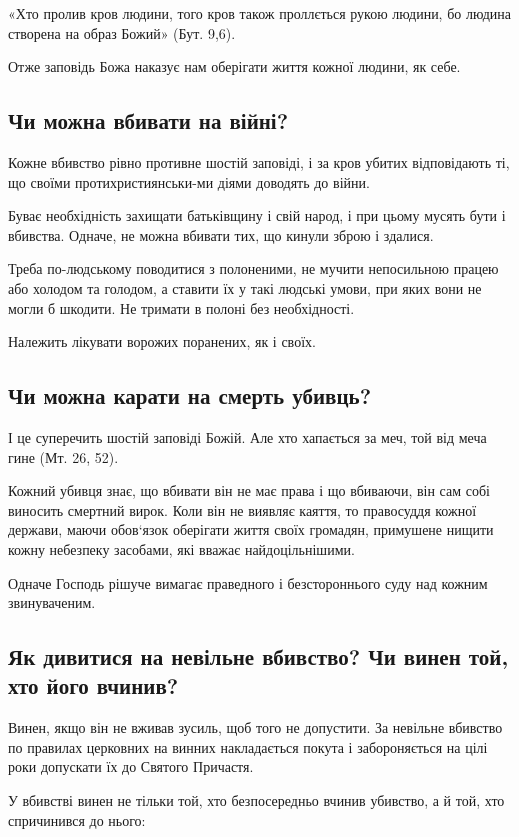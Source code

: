 \documentclass[main.tex]{subfiles}
\begin{document}
«Хто пролив кров людини, того кров також проллється рукою людини, бо людина створена на образ Божий» (Бут. 9,6).

Отже заповідь Божа наказує нам оберігати життя кожної людини, як себе.

\subsection{Чи можна вбивати на війні?}

Кожне вбивство рівно противне шостій заповіді, і за кров убитих відповідають ті, що своїми протихристиянськи-ми діями доводять до війни.

Буває необхідність захищати батьківщину і свій народ, і при цьому мусять бути і вбивства. Одначе, не можна вбивати тих, що кинули зброю і здалися.

Треба по-людському поводитися з полоненими, не мучити непосильною працею або холодом та голодом, а ставити їх у такі людські умови, при яких вони не могли б шкодити. Не тримати в полоні без необхідності.

Належить лікувати ворожих поранених, як і своїх.

\subsection{Чи можна карати на смерть убивць?}

І це суперечить шостій заповіді Божій. Але хто хапається за меч, той від меча гине (Мт. 26, 52).

Кожний убивця знає, що вбивати він не має права і що вбиваючи, він сам собі виносить смертний вирок. Коли він не виявляє каяття, то правосуддя кожної держави, маючи обов`язок оберігати життя своїх громадян, примушене нищити кожну небезпеку засобами, які вважає найдоцільнішими.

Одначе Господь рішуче вимагає праведного і безстороннього суду над кожним звинуваченим.

\subsection{Як дивитися на невільне вбивство? Чи винен той, хто його вчинив?}

Винен, якщо він не вживав зусиль, щоб того не допустити. За невільне вбивство по правилах церковних на винних накладається покута і забороняється на цілі роки допускати їх до Святого Причастя.

У вбивстві винен не тільки той, хто безпосередньо вчинив убивство, а й той, хто спричинився до нього:
\end{document}
